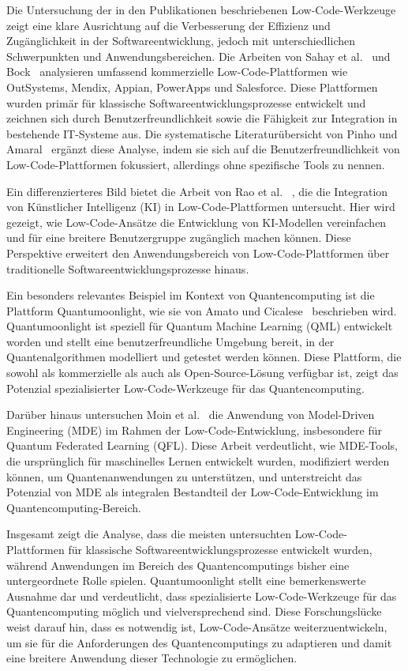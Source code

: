 Die Untersuchung der in den Publikationen beschriebenen Low-Code-Werkzeuge zeigt eine klare Ausrichtung auf die Verbesserung der 
Effizienz und Zugänglichkeit in der Softwareentwicklung, jedoch mit unterschiedlichen Schwerpunkten und Anwendungsbereichen. 
Die Arbeiten von Sahay et al.~\cite{Sahay_2020} und Bock~\cite{Bock_2021_essence} analysieren umfassend kommerzielle 
Low-Code-Plattformen wie OutSystems, Mendix, Appian, PowerApps und Salesforce. Diese Plattformen wurden primär für klassische 
Softwareentwicklungsprozesse entwickelt und zeichnen sich durch Benutzerfreundlichkeit sowie die Fähigkeit zur Integration in 
bestehende IT-Systeme aus. Die systematische Literaturübersicht von Pinho und Amaral~\cite{Pinho_2022} ergänzt diese 
Analyse, indem sie sich auf die Benutzerfreundlichkeit von Low-Code-Plattformen fokussiert, allerdings ohne spezifische Tools 
zu nennen.

Ein differenzierteres Bild bietet die Arbeit von Rao et al. ~\cite{rao2024}, die die Integration von Künstlicher Intelligenz 
(KI) in Low-Code-Plattformen untersucht. Hier wird gezeigt, wie Low-Code-Ansätze die Entwicklung von KI-Modellen vereinfachen und 
für eine breitere Benutzergruppe zugänglich machen können. Diese Perspektive erweitert den Anwendungsbereich von Low-Code-Plattformen 
über traditionelle Softwareentwicklungsprozesse hinaus.

Ein besonders relevantes Beispiel im Kontext von Quantencomputing ist die Plattform Quantumoonlight, wie sie von Amato und 
Cicalese~\cite{Amato_2023} beschrieben wird. Quantumoonlight ist speziell für Quantum Machine Learning (QML) entwickelt worden 
und stellt eine benutzerfreundliche Umgebung bereit, in der Quantenalgorithmen modelliert und getestet werden können. Diese 
Plattform, die sowohl als kommerzielle als auch als Open-Source-Lösung verfügbar ist, zeigt das Potenzial spezialisierter 
Low-Code-Werkzeuge für das Quantencomputing.

Darüber hinaus untersuchen Moin et al.~\cite{Moin_2023} die Anwendung von Model-Driven Engineering (MDE) im Rahmen der 
Low-Code-Entwicklung, insbesondere für Quantum Federated Learning (QFL). Diese Arbeit verdeutlicht, wie MDE-Tools, die 
ursprünglich für maschinelles Lernen entwickelt wurden, modifiziert werden können, um Quantenanwendungen zu unterstützen, und 
unterstreicht das Potenzial von MDE als integralen Bestandteil der Low-Code-Entwicklung im Quantencomputing-Bereich.

Insgesamt zeigt die Analyse, dass die meisten untersuchten Low-Code-Plattformen für klassische Softwareentwicklungsprozesse 
entwickelt wurden, während Anwendungen im Bereich des Quantencomputings bisher eine untergeordnete Rolle spielen. Quantumoonlight 
stellt eine bemerkenswerte Ausnahme dar und verdeutlicht, dass spezialisierte Low-Code-Werkzeuge für das Quantencomputing möglich 
und vielversprechend sind. Diese Forschungslücke weist darauf hin, dass es notwendig ist, Low-Code-Ansätze weiterzuentwickeln, um 
sie für die Anforderungen des Quantencomputings zu adaptieren und damit eine breitere Anwendung dieser Technologie zu ermöglichen.

